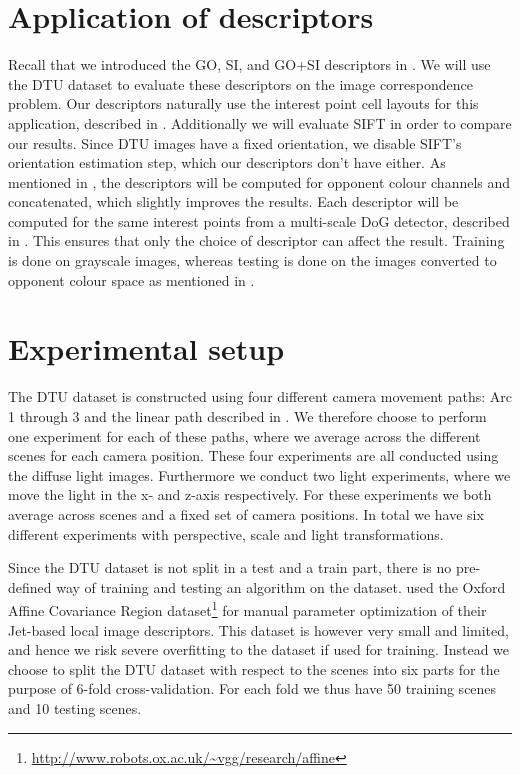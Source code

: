 \documentclass[thesis.tex]{subfiles}
\begin{document}
\section{Application of descriptors}
%
Recall that we introduced the GO, SI, and GO+SI descriptors in .
We will use the DTU dataset to evaluate these descriptors on the image correspondence problem. Our descriptors naturally use the interest point cell layouts for this application, described in . Additionally we will evaluate SIFT in order to compare our results. Since DTU images have a fixed orientation, we disable SIFT's orientation estimation step, which our descriptors don't have either. As mentioned in , the descriptors will be computed for opponent colour channels and concatenated, which slightly improves the results. Each descriptor will be computed for the same interest points from a multi-scale DoG detector, described in . This ensures that only the choice of descriptor can affect the result. Training is done on grayscale images, whereas testing is done on the images converted to opponent colour space as mentioned in .
%
\section{Experimental setup}
%
The DTU dataset is constructed using four different camera movement paths: Arc 1 through 3 and the linear path described in . We therefore choose to perform one experiment for each of these paths, where we average across the different scenes for each camera position. These four experiments are all conducted using the diffuse light images. Furthermore we conduct two light experiments, where we move the light in the x- and z-axis respectively. For these experiments we both average across scenes and a fixed set of camera positions. In total we have six different experiments with perspective, scale and light transformations.

Since the DTU dataset is not split in a test and a train part, there is no pre-defined way of training and testing an algorithm on the dataset. \citet{larsen2012jet} used the Oxford Affine Covariance Region dataset\footnote{\url{http://www.robots.ox.ac.uk/~vgg/research/affine}} for manual parameter optimization of their Jet-based local image descriptors. This dataset is however very small and limited, and hence we risk severe overfitting to the dataset if used for training. Instead we choose to split the DTU dataset with respect to the scenes into six parts for the purpose of 6-fold cross-validation. For each fold we thus have 50 training scenes and 10 testing scenes.
\end{document}
